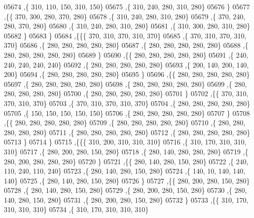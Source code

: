 \begin{DoxyCode}
05674     ,\{   310,   110,   150,   310,   150\}
05675     ,\{   310,   240,   280,   310,   280\}
05676     \}
05677    ,\{\{   370,   300,   280,   370,   280\}
05678     ,\{   310,   240,   280,   310,   280\}
05679     ,\{   370,   240,   280,   370,   280\}
05680     ,\{   310,   240,   280,   310,   280\}
05681     ,\{   310,   300,   280,   310,   280\}
05682     \}
05683    \}
05684   ,\{\{\{   370,   310,   370,   310,   370\}
05685     ,\{   370,   310,   370,   310,   370\}
05686     ,\{   280,   280,   280,   280,   280\}
05687     ,\{   280,   280,   280,   280,   280\}
05688     ,\{   280,   280,   280,   280,   280\}
05689     \}
05690    ,\{\{   280,   280,   280,   280,   280\}
05691     ,\{   240,   240,   240,   240,   240\}
05692     ,\{   280,   280,   280,   280,   280\}
05693     ,\{   200,   140,   200,   140,   200\}
05694     ,\{   280,   280,   280,   280,   280\}
05695     \}
05696    ,\{\{   280,   280,   280,   280,   280\}
05697     ,\{   280,   280,   280,   280,   280\}
05698     ,\{   280,   280,   280,   280,   280\}
05699     ,\{   280,   280,   280,   280,   280\}
05700     ,\{   280,   280,   280,   280,   280\}
05701     \}
05702    ,\{\{   370,   310,   370,   310,   370\}
05703     ,\{   370,   310,   370,   310,   370\}
05704     ,\{   280,   280,   280,   280,   280\}
05705     ,\{   150,   150,   150,   150,   150\}
05706     ,\{   280,   280,   280,   280,   280\}
05707     \}
05708    ,\{\{   280,   280,   280,   280,   280\}
05709     ,\{   280,   280,   280,   280,   280\}
05710     ,\{   280,   280,   280,   280,   280\}
05711     ,\{   280,   280,   280,   280,   280\}
05712     ,\{   280,   280,   280,   280,   280\}
05713     \}
05714    \}
05715   ,\{\{\{   310,   200,   310,   310,   310\}
05716     ,\{   310,   170,   310,   310,   310\}
05717     ,\{   280,   200,   280,   150,   280\}
05718     ,\{   280,   140,   280,   280,   280\}
05719     ,\{   280,   200,   280,   280,   280\}
05720     \}
05721    ,\{\{   280,   140,   280,   150,   280\}
05722     ,\{   240,   110,   240,   110,   240\}
05723     ,\{   280,   140,   280,   150,   280\}
05724     ,\{   140,    10,   140,   140,   140\}
05725     ,\{   280,   140,   280,   150,   280\}
05726     \}
05727    ,\{\{   280,   200,   280,   150,   280\}
05728     ,\{   280,   140,   280,   150,   280\}
05729     ,\{   280,   200,   280,   150,   280\}
05730     ,\{   280,   140,   280,   150,   280\}
05731     ,\{   280,   200,   280,   150,   280\}
05732     \}
05733    ,\{\{   310,   170,   310,   310,   310\}
05734     ,\{   310,   170,   310,   310,   310\}

\end{DoxyCode}
